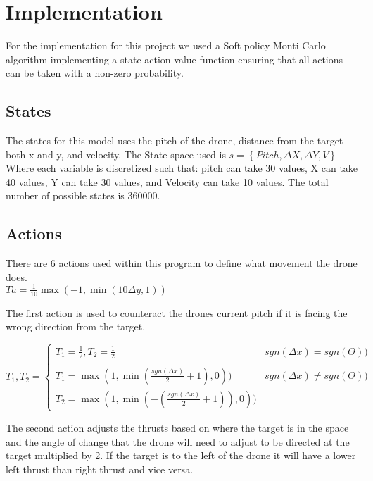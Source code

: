 \section{Implementation}
For the implementation for this project we used a Soft policy Monti Carlo algorithm implementing a state-action value function ensuring that all actions can be taken with a non-zero probability. 

\subsection{States}
The states for this model uses the pitch of the drone, distance from the target both x and y, and velocity.
The State space used is 
$s={\left \{ Pitch, \Delta X, \Delta Y, V \right \}}$
Where each variable is discretized such that: pitch can take 30 values, X can take 40 values, Y can take 30 values, and Velocity can take 10 values. The total number of possible states is 360000.

\subsection{Actions}
There are 6 actions used within this program to define what movement the drone does.
\\
\begingroup\centering
$Ta =  \frac{1}{10}\max (-1,\min (10\Delta y,1))$

\endgroup

The first action is used to counteract the drones current pitch if it is facing the wrong direction from the target. 

\begingroup
$
T_1, T_2 = 
\left\{\begin{matrix}
    T_1 = \frac{1}{2}, T_2 = \frac{1}{2} & sgn(\Delta x) = sgn(\Theta ))

    \\ \\
    T_1 = \max (1,\min (\frac{sgn (\Delta x)}{2}+1),0)) & sgn(\Delta x) \neq sgn(\Theta ))
    & \\
    T_2 = \max (1,\min (-(\frac{sgn (\Delta x)}{2}+1)),0))
    \end{matrix}\right.$
\break
\endgroup

The second action adjusts the thrusts based on where the target is in the space and the angle of change that the drone will need to adjust to be directed at the target multiplied by 2. If the target is to the left of the drone it will have a lower left thrust than right thrust and vice versa. 

